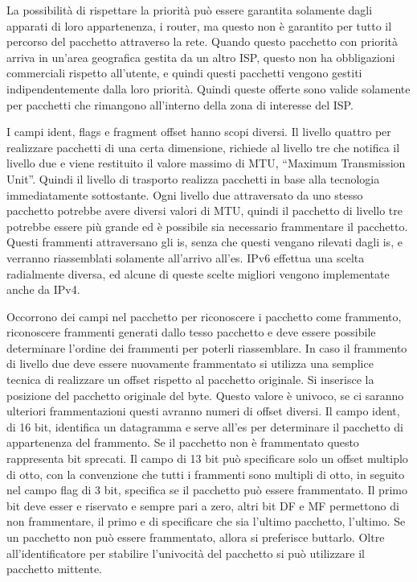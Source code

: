 \documentclass{article}
\numberwithin{equation}{subsection}
\begin{document}
La possibilità di rispettare la priorità può essere garantita solamente dagli apparati di loro appartenenza, i router, ma questo non è garantito per tutto il 
percorso del pacchetto attraverso la rete. Quando questo pacchetto con priorità arriva in un'area geografica gestita da un altro ISP, questo non ha obbligazioni 
commerciali rispetto all'utente, e quindi questi pacchetti vengono gestiti indipendentemente dalla loro priorità. 
Quindi queste offerte sono valide solamente per pacchetti che rimangono all'interno della zona di interesse del ISP. 

I campi ident, flags e fragment offset hanno scopi diversi. Il livello quattro per realizzare pacchetti di una certa dimensione, richiede al livello tre che 
notifica il livello due e viene restituito il valore massimo di MTU, ``Maximum Transmission Unit''. Quindi il livello di trasporto realizza pacchetti in base alla tecnologia immediatamente 
sottostante. Ogni livello due attraversato da uno stesso pacchetto potrebbe avere diversi valori di MTU, quindi il pacchetto di livello tre potrebbe essere più 
grande ed è possibile sia necessario frammentare il pacchetto. Questi frammenti attraversano gli is, senza che questi vengano rilevati dagli is, e verranno riassemblati solamente all'arrivo all'es. 
IPv6 effettua una scelta radialmente diversa, ed alcune di queste scelte migliori vengono implementate anche da IPv4. 

Occorrono dei campi nel pacchetto per riconoscere i pacchetto come frammento, riconoscere frammenti generati dallo tesso pacchetto e deve essere possibile determinare 
l'ordine dei frammenti per poterli riassemblare. 
In caso il frammento di livello due deve essere nuovamente frammentato si utilizza una semplice tecnica di realizzare un offset rispetto al pacchetto originale. Si 
inserisce la posizione del pacchetto originale del byte. Questo valore è univoco, se ci saranno ulteriori frammentazioni questi avranno numeri di offset diversi. 
Il campo ident, di 16 bit, identifica un datagramma e serve all'es per determinare il pacchetto di appartenenza del frammento. Se il pacchetto non è frammentato questo rappresenta bit sprecati.  
Il campo di 13 bit può specificare solo un offset multiplo di otto, con la convenzione che tutti i frammenti sono multipli di otto, in seguito nel campo 
flag di 3 bit, specifica se il pacchetto può essere frammentato. Il primo bit deve esser e riservato e sempre pari a zero, altri bit DF e MF permettono di non frammentare, 
il primo e di specificare che sia l'ultimo pacchetto, l'ultimo. Se un pacchetto non può essere frammentato, allora si preferisce buttarlo. 
Oltre all'identificatore per stabilire l'univocità del pacchetto si può utilizzare il pacchetto mittente. 
\end{document}
